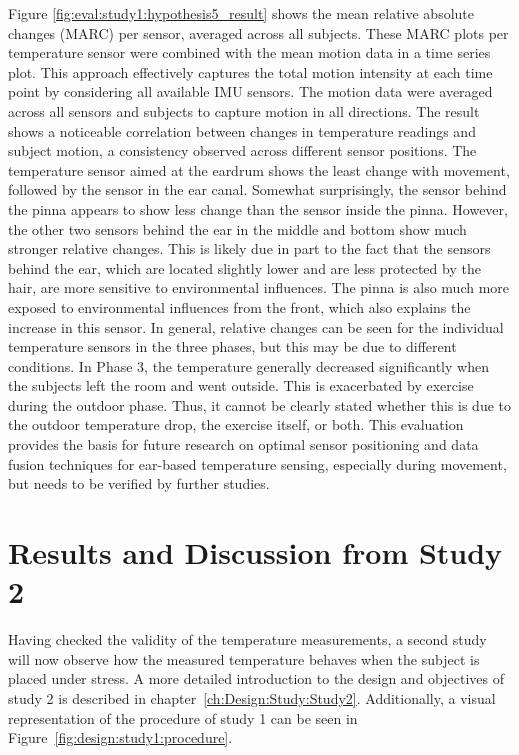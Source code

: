 Figure \ref{fig:eval:study1:hypothesis5_result} shows the mean relative absolute changes (MARC) per sensor, averaged across all subjects.
These MARC plots per temperature sensor were combined with the mean motion data in a time series plot.
This approach effectively captures the total motion intensity at each time point by considering all available IMU sensors.
The motion data were averaged across all sensors and subjects to capture motion in all directions.
The result shows a noticeable correlation between changes in temperature readings and subject motion, a consistency observed across different sensor positions.
The temperature sensor aimed at the eardrum shows the least change with movement, followed by the sensor in the ear canal.
Somewhat surprisingly, the sensor behind the pinna appears to show less change than the sensor inside the pinna. 
However, the other two sensors behind the ear in the middle and bottom show much stronger relative changes. 
This is likely due in part to the fact that the sensors behind the ear, which are located slightly lower and are less protected by the hair, are more sensitive to environmental influences. 
The pinna is also much more exposed to environmental influences from the front, which also explains the increase in this sensor.
In general, relative changes can be seen for the individual temperature sensors in the three phases, but this may be due to different conditions. 
In Phase 3, the temperature generally decreased significantly when the subjects left the room and went outside.
This is exacerbated by exercise during the outdoor phase. 
Thus, it cannot be clearly stated whether this is due to the outdoor temperature drop, the exercise itself, or both.
This evaluation provides the basis for future research on optimal sensor positioning and data fusion techniques for ear-based temperature sensing, especially during movement, but needs to be verified by further studies.

\section{Results and Discussion from Study 2}
\label{sec:Evaluation:Study2}
Having checked the validity of the temperature measurements, a second study will now observe how the measured temperature behaves when the subject is placed under stress.
A more detailed introduction to the design and objectives of study 2 is described in chapter~\ref{ch:Design:Study:Study2}.
Additionally, a visual representation of the procedure of study 1 can be seen in Figure~\ref{fig:design:study1:procedure}.

